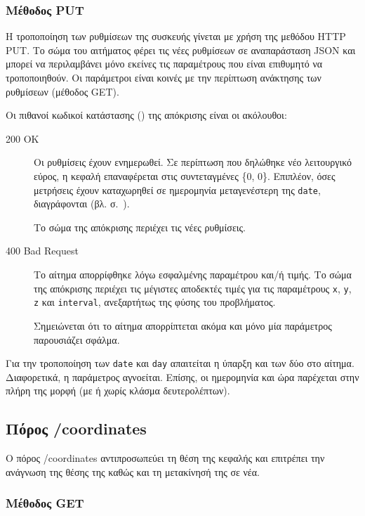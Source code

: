 \subsubsection{Μέθοδος PUT}

Η τροποποίηση των ρυθμίσεων της συσκευής γίνεται με χρήση της μεθόδου HTTP PUT.
Το σώμα του αιτήματος φέρει τις νέες ρυθμίσεων σε αναπαράσταση JSON και μπορεί
να περιλαμβάνει μόνο εκείνες τις παραμέτρους που είναι επιθυμητό να
τροποποιηθούν. Οι παράμετροι είναι κοινές με την περίπτωση ανάκτησης των
ρυθμίσεων (μέθοδος GET).

Οι πιθανοί κωδικοί κατάστασης () της απόκρισης είναι οι
ακόλουθοι:
\begin{description}
    \item[200 OK] Οι ρυθμίσεις έχουν ενημερωθεί. Σε περίπτωση που δηλώθηκε νέο
    λειτουργικό εύρος, η κεφαλή επαναφέρεται στις συντεταγμένες \{0, 0\}.
    Επιπλέον, όσες μετρήσεις έχουν καταχωρηθεί σε ημερομηνία μεταγενέστερη της
    \verb~date~, διαγράφονται (βλ. 
    σ.~\pageref{ssubsec:log:linear}).

    Το σώμα της απόκρισης περιέχει τις νέες ρυθμίσεις.

    \item[400 Bad Request] Το αίτημα απορρίφθηκε λόγω εσφαλμένης παραμέτρου
    και\slash{}ή τιμής. Το σώμα της απόκρισης περιέχει τις μέγιστες αποδεκτές
    τιμές για τις παραμέτρους \verb~x~, \verb~y~, \verb~z~ και \verb~interval~,
    ανεξαρτήτως της φύσης του προβλήματος.

    Σημειώνεται ότι το αίτημα απορρίπτεται ακόμα και μόνο μία παράμετρος
    παρουσιάζει σφάλμα.
\end{description}

Για την τροποποίηση των \verb~date~ και \verb~day~ απαιτείται η ύπαρξη και των
δύο στο αίτημα. Διαφορετικά, η παράμετρος αγνοείται. Επίσης, οι ημερομηνία και
ώρα παρέχεται στην πλήρη της μορφή (με ή χωρίς κλάσμα δευτερολέπτων).


\subsection{Πόρος /coordinates}

Ο πόρος /coordinates αντιπροσωπεύει τη θέση της κεφαλής και επιτρέπει την
ανάγνωση της θέσης της καθώς και τη μετακίνησή της σε νέα.


\subsubsection{Μέθοδος GET}

